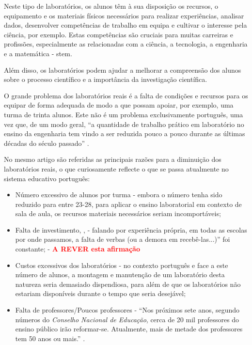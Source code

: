 Neste tipo de laboratórios, os alunos têm à sua disposição os recursos, o equipamento e os materiais físicos necessários para realizar experiências, analisar dados, desenvolver competências de trabalho em equipa e cultivar o interesse pela ciência, por exemplo. Estas competências são cruciais para muitas carreiras e profissões, especialmente as relacionadas com a ciência, a tecnologia, a engenharia e a matemática - \acrshort{stem}.

Além disso, os laboratórios podem ajudar a melhorar a compreensão dos alunos sobre o processo científico e a importância da investigação científica.

O grande problema dos laboratórios reais é a falta de condições e recursos para os equipar de forma adequada de modo a que possam apoiar, por exemplo, uma turma de trinta alunos. Este não é um problema exclusivamente português, uma vez que, de um modo geral, ``a quantidade de trabalho prático em laboratório no ensino da engenharia tem vindo a ser reduzida pouco a pouco durante as últimas décadas do século passado'' \cite{PaperTit40:online}.

No mesmo artigo \cite{PaperTit40:online} são referidas as principais razões para a diminuição dos laboratórios reais, o que curiosamente reflecte o que se passa atualmente no sistema educativo português:

\begin{itemize}
    \item Número excessivo de alunos por turma \cite{Reduçãod55:online} - embora o número tenha sido reduzido para entre 23-28, para aplicar o ensino laboratorial em contexto de sala de aula, os recursos materiais necessários seriam incomportáveis;
    \item Falta de investimento\cite{Faltadei99:online}, \cite{Odesinve56:online}, \cite{EDUSTATP20:online} - falando por experiência própria, em todas as escolas por onde passamos, a falta de verbas (ou a demora em recebê-las...)'' foi constante; - \textcolor{red}{\textbf{A REVER esta afirmação}}
    \item Custos excessivos dos laboratórios - no contexto português e face a este número de alunos, a montagem e manutenção de um laboratório desta natureza seria demasiado dispendiosa, para além de que os laboratórios não estariam disponíveis durante o tempo que seria desejável;
    \item Falta de professores/Poucos professores - ``Nos próximos sete anos, segundo números do \textit{Conselho Nacional de Educação}, cerca de 20 mil professores do ensino público irão reformar-se. Atualmente, mais de metade dos professores tem 50 anos ou mais.'' \cite{Faltaded39:online}.
\end{itemize}

